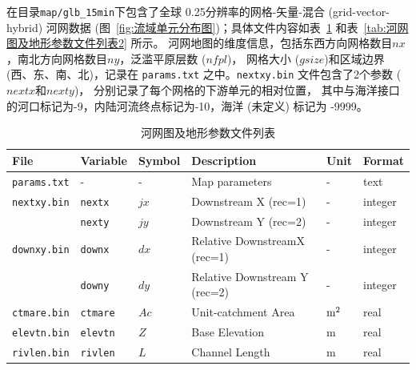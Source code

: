 在目录\texttt{map/glb\_15min}下包含了全球 0.25\textdegree 分辨率的网格-矢量-混合 (grid-vector-hybrid) 河网数据 (图~\ref{fig:流域单元分布图})；具体文件内容如表~\ref{tab:河网图及地形参数文件列表} 和表~\ref{tab:河网图及地形参数文件列表2} 所示。 河网地图的维度信息，包括东西方向网格数目$nx$，南北方向网格数目$ny$，泛滥平原层数 ($nfpl$)，
网格大小 ($gsize$)和区域边界 (西、东、南、北)，记录在 \texttt{params.txt} 之中。\texttt{nextxy.bin} 文件包含了2个参数 ($nextx$和$nexty$)，
分别记录了每个网格的下游单元的相对位置，
其中与海洋接口的河口标记为-9，内陆河流终点标记为-10，海洋 (未定义) 标记为 -9999。

\begin{table}[htbp]
\centering
\caption{河网图及地形参数文件列表}
\label{tab:河网图及地形参数文件列表}
    \begin{tabular}[h]{p{3.5cm}p{1.5cm}p{1.5cm}p{5cm}p{1cm}p{1cm}}  %
    \toprule
    File              & Variable & Symbol                        & Description                                  & Unit    & Format  \\ \midrule
    \texttt{params.txt}        & -        & -                             & Map parameters                     & -         & text    \\
    \texttt{nextxy.bin}        & \texttt{nextx}    & $jx$                         & Downstream X (rec=1)         & -         & integer \\
                                       & \texttt{nexty}    & $jy$                         & Downstream Y (rec=2)            & -        & integer \\
    \texttt{downxy.bin}      & \texttt{downx}   & $dx$                        & Relative DownstreamX (rec=1)   & -   & integer \\
                                       & \texttt{downy}   & $dy$                      & Relative Downstream Y (rec=2)   & -    & integer \\
    \texttt{ctmare.bin}       & \texttt{ctmare}   & $Ac$                     & Unit-catchment Area                     & $\rm m^2$   & real    \\
    \texttt{elevtn.bin}        & \texttt{elevtn}    & $Z$                        & Base Elevation                         & m       & real    \\
    \texttt{rivlen.bin}         & \texttt{rivlen}    & $L$                         & Channel Length                        & m       & real    \\

\end{tabular}
\end{table}
